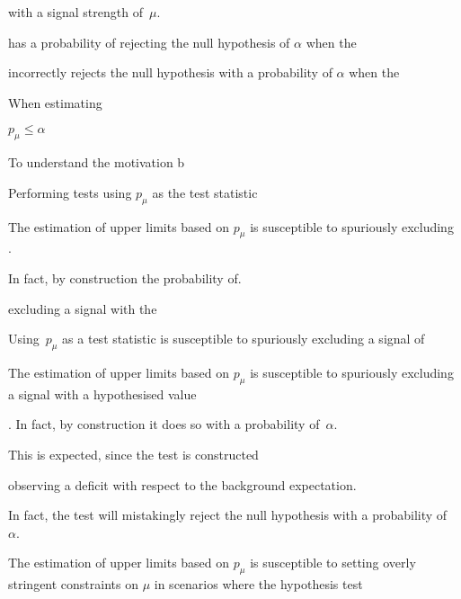 with a signal strength
of~$\mu$.


has a
probability of rejecting the null hypothesis of $\alpha$ when the

incorrectly
rejects the null hypothesis with a probability of $\alpha$ when the



When estimating



$p_\mu \leq \alpha$

To understand the motivation b

Performing tests using $p_\mu$ as the test statistic


The estimation of upper limits based on $p_\mu$ is susceptible to spuriously
excluding .


In fact, by construction the probability of.




excluding a signal with the


Using~$p_\mu$ as a test statistic is susceptible to
spuriously excluding a signal of



The estimation of upper limits based on $p_\mu$ is susceptible to spuriously
excluding a signal with a hypothesised value


. In fact, by construction it does
so with a probability of~$\alpha$.






This is expected, since the test is constructed







observing a deficit with respect to the background expectation.



In fact, the test
will mistakingly reject the null hypothesis with a probability of~$\alpha$.





The estimation of upper limits based on $p_\mu$ is
susceptible to setting overly stringent constraints on $\mu$ in scenarios where
the hypothesis test












